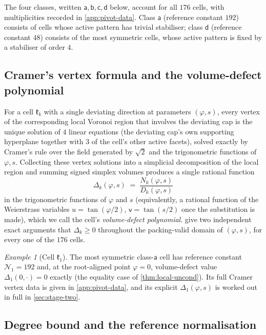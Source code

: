 \documentclass[11pt,reqno]{amsart}
\renewcommand{\_}{\origunderscore\allowbreak}
\numberwithin{equation}{section}
\theoremstyle{plain}
\theoremstyle{definition}
\theoremstyle{remark}
\newtheorem{example}[thm]{Example}
\newcommand{\Cell}[1]{\mathfrak{k}_{#1}}     %
\newcommand{\tilt}{\varphi}                  %
\newcommand{\arcp}{s}                        %
\newcommand{\defect}{\Delta}                 %
\newcommand{\norm}[1]{\mathcal{N}_{#1}}      %
\newcommand{\base}{u}                        %
\begin{document}
The four classes, written $\mathsf a,\mathsf b,\mathsf c,\mathsf d$
below, account for all $176$ cells, with
multiplicities recorded in \cref{app:pivot-data}. Class $\mathsf a$
(reference constant $192$) consists of cells whose active pattern has
trivial stabiliser; class $\mathsf d$ (reference constant $48$)
consists of the most symmetric cells, whose active pattern is fixed by
a stabiliser of order $4$.

\subsection{Cramer's vertex formula and the volume-defect polynomial}

For a cell $\Cell{k}$ with a single deviating direction at parameters
$(\tilt,\arcp)$, every vertex of the corresponding local Voronoi region
that involves the deviating cap is the unique solution of $4$ linear
equations (the deviating cap's own supporting hyperplane together with
$3$ of the cell's other active facets), solved exactly by Cramer's rule
over the field generated by $\sqrt2$ and the trigonometric functions of
$\tilt,\arcp$. Collecting these vertex solutions into a simplicial
decomposition of the local region and summing signed simplex volumes
produces a single rational function
\[
  \defect_k(\tilt,\arcp) \;=\; \frac{N_k(\tilt,\arcp)}{D_k(\tilt,\arcp)}
\]
in the trigonometric functions of $\tilt$ and $\arcp$ (equivalently, a
rational function of the Weierstrass variables
$\base=\tan(\tilt/2)$, $\mathsf v=\tan(\arcp/2)$ once the
substitution is made), which we call the cell's \emph{volume-defect
polynomial}.  give two independent
exact arguments that $\defect_k\ge0$ throughout the packing-valid
domain of $(\tilt,\arcp)$, for every one of the $176$ cells.

\begin{example}[Cell $\Cell1$]\label{ex:cell1-new}
The most symmetric class-$\mathsf a$ cell has reference constant
$\norm1=192$ and, at the root-aligned point $\tilt=0$, volume-defect
value $\defect_1(0,\cdot)=0$ exactly (the equality case of
\cref{thm:local-uncond}). Its full Cramer vertex data is given in
\cref{app:pivot-data}, and its explicit $\defect_1(\tilt,\arcp)$ is
worked out in full in \cref{sec:stage-two}.
\end{example}

\subsection{Degree bound and the reference normalisation}
\end{document}
